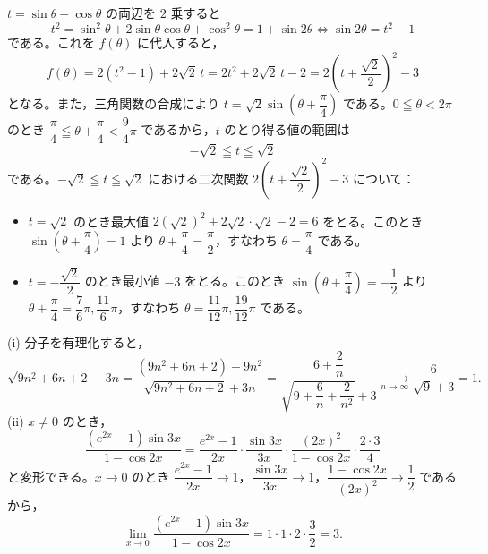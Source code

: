 
$t=\sin\theta+\cos\theta$ の両辺を $2$ 乗すると
\[
  t^{2} = \sin^{2}\theta+2\sin\theta\cos\theta+\cos^{2}\theta = 1+\sin 2\theta
  \iff \sin 2\theta = t^{2}-1
\]
である。これを $f(\theta)$ に代入すると，
\[
  f(\theta) = 2(t^{2}-1) + 2\sqrt{2}\,t = 2t^{2}+2\sqrt{2}\,t-2 = 2\left(t+\frac{\sqrt{2}}{2}\right)^{2}-3
\]
となる。また，三角関数の合成により $t=\sqrt{2}\sin\left(\theta+\dfrac{\pi}{4}\right)$ である。$0\leqq\theta<2\pi$ のとき $\dfrac{\pi}{4}\leqq\theta+\dfrac{\pi}{4}<\dfrac{9}{4}\pi$ であるから，$t$ のとり得る値の範囲は
\[
  -\sqrt{2} \leqq t \leqq \sqrt{2}
\]
である。$-\sqrt{2}\leqq t\leqq\sqrt{2}$ における二次関数 $2\left(t+\dfrac{\sqrt{2}}{2}\right)^{2}-3$ について：
\begin{itemize}[leftmargin=1.6em,itemsep=2pt]
  \item $t=\sqrt{2}$ のとき最大値 $2(\sqrt{2})^{2}+2\sqrt{2}\cdot\sqrt{2}-2=6$ をとる。このとき $\sin\left(\theta+\dfrac{\pi}{4}\right)=1$ より $\theta+\dfrac{\pi}{4}=\dfrac{\pi}{2}$，すなわち $\theta=\dfrac{\pi}{4}$ である。
  \item $t=-\dfrac{\sqrt{2}}{2}$ のとき最小値 $-3$ をとる。このとき $\sin\left(\theta+\dfrac{\pi}{4}\right)=-\dfrac{1}{2}$ より $\theta+\dfrac{\pi}{4}=\dfrac{7}{6}\pi, \dfrac{11}{6}\pi$，すなわち $\theta=\dfrac{11}{12}\pi, \dfrac{19}{12}\pi$ である。
\end{itemize}


(i) 分子を有理化すると，
\[
  \sqrt{9n^{2}+6n+2}-3n
  = \frac{(9n^{2}+6n+2)-9n^{2}}{\sqrt{9n^{2}+6n+2}+3n}
  = \frac{6+\dfrac{2}{n}}{\sqrt{9+\dfrac{6}{n}+\dfrac{2}{n^{2}}}+3}
  \xrightarrow[n\to\infty]{} \frac{6}{\sqrt{9}+3} = 1.
\]
(ii) $x\neq 0$ のとき，
\[
  \frac{(e^{2x}-1)\sin 3x}{1-\cos 2x}
  = \frac{e^{2x}-1}{2x}\cdot\frac{\sin 3x}{3x}\cdot\frac{(2x)^{2}}{1-\cos 2x}\cdot\frac{2\cdot 3}{4}
\]
と変形できる。$x\to 0$ のとき $\dfrac{e^{2x}-1}{2x}\to 1$，$\dfrac{\sin 3x}{3x}\to 1$，$\dfrac{1-\cos 2x}{(2x)^{2}}\to\dfrac{1}{2}$ であるから，
\[
  \lim_{x\to 0}\frac{(e^{2x}-1)\sin 3x}{1-\cos 2x}
  = 1\cdot 1\cdot 2\cdot\frac{3}{2} = 3.
\]

